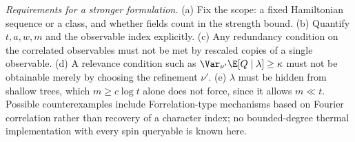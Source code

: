 \begin{remark}
\emph{Requirements for a stronger formulation.} (a) Fix the scope: a
fixed Hamiltonian sequence or a class, and whether fields count in the
strength bound. (b) Quantify \(t,a,w,m\) and the observable index
explicitly. (c) Any redundancy condition on the correlated observables
must not be met by rescaled copies of a single observable. (d) A
relevance condition such as \(\Var_{\nu'}\E[Q\mid\lambda]\ge\kappa\) must
not be obtainable merely by choosing the refinement \(\nu'\). (e)
\(\lambda\) must be hidden from shallow trees, which
\(m\ge c\log t\) alone does not force, since it allows \(m\ll t\). Possible counterexamples include
Forrelation-type mechanisms based on Fourier correlation rather than
recovery of a character index; no bounded-degree thermal implementation
with every spin queryable is known here.
\end{remark}
